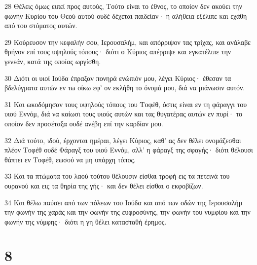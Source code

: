 \par 28 Θέλεις όμως ειπεί προς αυτούς, Τούτο είναι το έθνος, το οποίον δεν ακούει την φωνήν Κυρίου του Θεού αυτού ουδέ δέχεται παιδείαν· η αλήθεια εξέλιπε και εχάθη από του στόματος αυτών.
\par 29 Κούρευσον την κεφαλήν σου, Ιερουσαλήμ, και απόρριψον τας τρίχας, και ανάλαβε θρήνον επί τους υψηλούς τόπους· διότι ο Κύριος απέρριψε και εγκατέλιπε την γενεάν, κατά της οποίας ωργίσθη.
\par 30 Διότι οι υιοί Ιούδα έπραξαν πονηρά ενώπιόν μου, λέγει Κύριος· έθεσαν τα βδελύγματα αυτών εν τω οίκω εφ' ον εκλήθη το όνομά μου, διά να μιάνωσιν αυτόν.
\par 31 Και ωκοδόμησαν τους υψηλούς τόπους του Τοφέθ, όστις είναι εν τη φάραγγι του υιού Εννόμ, διά να καίωσι τους υιούς αυτών και τας θυγατέρας αυτών εν πυρί· το οποίον δεν προσέταξα ουδέ ανέβη επί την καρδίαν μου.
\par 32 Διά τούτο, ιδού, έρχονται ημέραι, λέγει Κύριος, καθ' ας δεν θέλει ονομάζεσθαι πλέον Τοφέθ ουδέ Φάραγξ του υιού Εννόμ, αλλ' η φάραγξ της σφαγής· διότι θέλουσι θάπτει εν Τοφέθ, εωσού να μη υπάρχη τόπος.
\par 33 Και τα πτώματα του λαού τούτου θέλουσιν είσθαι τροφή εις τα πετεινά του ουρανού και εις τα θηρία της γής· και δεν θέλει είσθαι ο εκφοβίζων.
\par 34 Και θέλω παύσει από των πόλεων του Ιούδα και από των οδών της Ιερουσαλήμ την φωνήν της χαράς και την φωνήν της ευφροσύνης, την φωνήν του νυμφίου και την φωνήν της νύμφης· διότι η γη θέλει κατασταθή έρημος.

\chapter{8}

